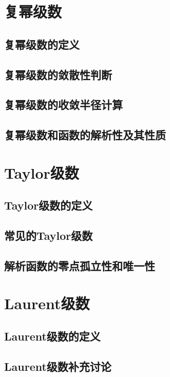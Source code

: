 \section{复幂级数}
    \subsection{复幂级数的定义}

    \subsection{复幂级数的敛散性判断}

    \subsection{复幂级数的收敛半径计算}

    \subsection{复幂级数和函数的解析性及其性质}

\section{Taylor级数}
    \subsection{Taylor级数的定义}

    \subsection{常见的Taylor级数}

    \subsection{解析函数的零点孤立性和唯一性}

\section{Laurent级数}
    \subsection{Laurent级数的定义}

    \subsection{Laurent级数补充讨论}

